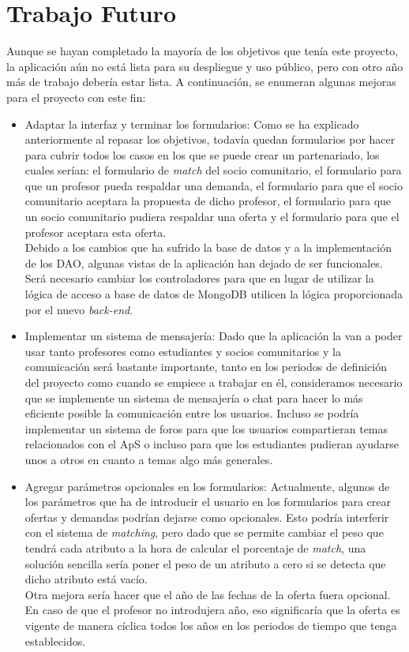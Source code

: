 \documentclass[11pt]{book}
\begin{document}
	\section{Trabajo Futuro}
	Aunque se hayan completado la mayoría de los objetivos que tenía este proyecto, la aplicación aún no está lista para su despliegue y uso público, pero con otro año más de trabajo debería estar lista. A continuación, se enumeran algunas mejoras para el proyecto con este fin:
	\begin{itemize}
		\item Adaptar la interfaz y terminar los formularios: Como se ha explicado anteriormente al repasar los objetivos, todavía quedan formularios por hacer para cubrir todos los casos en los que se puede crear un partenariado, los cuales serían: el formulario de \emph{match} del socio comunitario, el formulario para que un profesor pueda respaldar una demanda, el formulario para que el socio comunitario aceptara la propuesta de dicho profesor, el formulario para que un socio comunitario pudiera respaldar una oferta y el formulario para que el profesor aceptara esta oferta.\\
		Debido a los cambios que ha sufrido la base de datos y a la implementación de los DAO, algunas vistas de la aplicación han dejado de ser funcionales. Será necesario cambiar los controladores para que en lugar de utilizar la lógica de acceso a base de datos de MongoDB utilicen la lógica proporcionada por el nuevo \emph{back-end}.
		\item Implementar un sistema de mensajería: Dado que la aplicación la van a poder usar tanto profesores como estudiantes y socios comunitarios y la comunicación será bastante importante, tanto en los periodos de definición del proyecto como cuando se empiece a trabajar en él, consideramos necesario que se implemente un sistema de mensajería o chat para hacer lo más eficiente posible la comunicación entre los usuarios. Incluso se podría implementar un sistema de foros para que los usuarios compartieran temas relacionados con el ApS o incluso para que los estudiantes pudieran ayudarse unos a otros en cuanto a temas algo más generales.
		\item Agregar parámetros opcionales en los formularios: Actualmente, algunos de los parámetros que ha de introducir el usuario en los formularios para crear ofertas y demandas podrían dejarse como opcionales. Esto podría interferir con el sistema de \emph{matching}, pero dado que se permite cambiar el peso que tendrá cada atributo a la hora de calcular el porcentaje de \emph{match}, una solución sencilla sería poner el peso de un atributo a cero si se detecta que dicho atributo está vacío.\\
		Otra mejora sería hacer que el año de las fechas de la oferta fuera opcional. En caso de que el profesor no introdujera año, eso significaría que la oferta es vigente de manera cíclica todos los años en los periodos de tiempo que tenga establecidos.
	\end{itemize}
	
\end{document}
